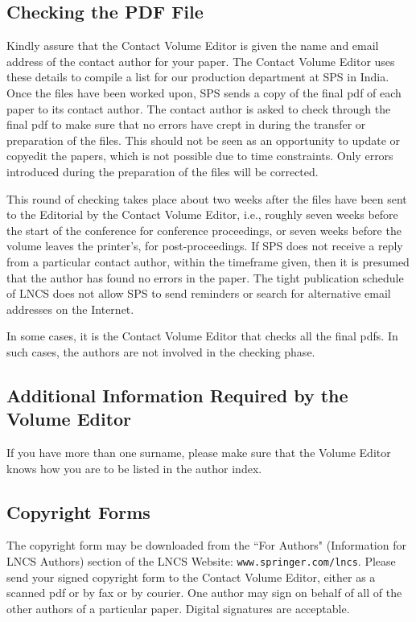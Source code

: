 \documentclass[runningheads]{llncs}
\begin{document}
{\subsection{Checking the PDF File}

Kindly assure that the Contact Volume Editor is given the name and email
address of the contact author for your paper. The Contact Volume Editor
uses these details to compile a list for our production department at
SPS in India. Once the files have been worked upon, SPS sends a copy of
the final pdf of each paper to its contact author. The contact author is
asked to check through the final pdf to make sure that no errors have
crept in during the transfer or preparation of the files. This should
not be seen as an opportunity to update or copyedit the papers, which is
not possible due to time constraints. Only errors introduced during the
preparation of the files will be corrected.

This round of checking takes place about two weeks after the files have
been sent to the Editorial by the Contact Volume Editor, i.e., roughly
seven weeks before the start of the conference for conference
proceedings, or seven weeks before the volume leaves the printer's, for
post-proceedings. If SPS does not receive a reply from a particular
contact author, within the timeframe given, then it is presumed that the
author has found no errors in the paper. The tight publication schedule
of LNCS does not allow SPS to send reminders or search for alternative
email addresses on the Internet.

In some cases, it is the Contact Volume Editor that checks all the final
pdfs. In such cases, the authors are not involved in the checking phase.

\subsection{Additional Information Required by the Volume Editor}

If you have more than one surname, please make sure that the Volume Editor
knows how you are to be listed in the author index.

\subsection{Copyright Forms}

The copyright form may be downloaded from the ``For Authors"
(Information for LNCS Authors)
section of the LNCS Website: \texttt{www.springer.com/lncs}.
Please send your signed copyright
form to the Contact Volume Editor, either as a scanned pdf or by fax or
by courier. One author may sign on behalf of all of the other authors of a particular
paper. Digital signatures are acceptable.

}
\end{document}
